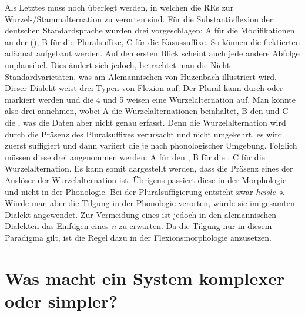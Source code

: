 \begin{exe}
\begin{exe}
Als Letztes muss noch überlegt werden, in welchen  die RRs zur Wur\-zel-/Stamm\-al\-ter\-na\-tion zu verorten sind. Für die Substantivflexion der deutschen Standardsprache wurden drei  vorgeschlagen:  A für die Modifikationen an der  (),  B für die Pluralsuffixe,  C für die Kasussuffixe. So können die flektierten  adäquat aufgebaut werden. Auf den ersten Blick scheint auch jede andere Abfolge unplausibel. Dies ändert sich jedoch, betrachtet man die Nicht-Stan\-dard\-va\-ri\-e\-tä\-ten, was am Alemannischen von Huzenbach illustriert wird. Dieser Dialekt weist drei Typen von Flexion auf: Der Plural kann durch  oder  markiert werden und die  4 und 5 weisen eine Wurzelalternation auf. Man könnte also drei  annehmen, wobei  A die Wurzelalternationen beinhaltet,  B den  und  C die , was die Daten aber nicht genau erfasst. Denn die Wurzelalternation wird durch die Präsenz des Pluralsuffixes verursacht und nicht umgekehrt, es wird zuerst suffigiert und dann variiert die  je nach phonologischer Umgebung. Folglich müssen diese drei  angenommen werden:  A für den ,  B für die ,  C für die Wurzelalternation. Es kann somit dargestellt werden, dass die Präsenz eines  der Auslöser der Wurzelalternation ist. Übrigens passiert diese  in der Morphologie und nicht in der Phonologie. Bei der Pluralsuffigierung entsteht zwar \textit{heisle-ə}. Würde man aber die Tilgung in der Phonologie verorten, würde sie im gesamten Dialekt angewendet. Zur Vermeidung eines  ist jedoch in den alemannischen Dialekten das Einfügen eines \textit{n} zu erwarten. Da die Tilgung nur in diesem Paradigma gilt, ist die Regel dazu in der Flexionsmorphologie anzusetzen.\largerpage

\section{Was macht ein System komplexer oder simpler?}\label{4.2}


\end{exe}
\end{exe}
